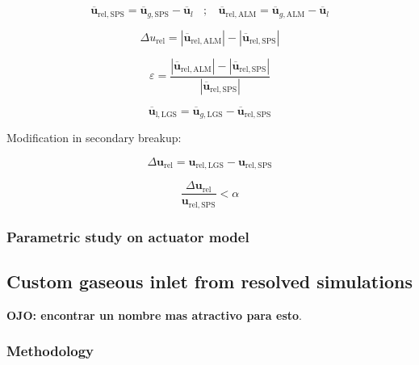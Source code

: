 \begin{equation}
\overline{\textbf{u}}_\mathrm{rel,SPS} = \overline{\textbf{u}}_{g,\mathrm{SPS}} - \overline{\textbf{u}}_l ~~~~ ; ~~~~  \overline{\textbf{u}}_\mathrm{rel,ALM} = \overline{\textbf{u}}_{g,\mathrm{ALM}} - \overline{\textbf{u}}_l
\end{equation}

\begin{equation}
\Delta u_\mathrm{rel} = | \overline{\textbf{u}}_\mathrm{rel,ALM}| - |\overline{\textbf{u}}_\mathrm{rel,SPS}|
\end{equation}

\begin{equation}
\varepsilon =  \frac{|\overline{\textbf{u}}_\mathrm{rel,ALM}| - |\overline{\textbf{u}}_\mathrm{rel,SPS}|}{|\overline{\textbf{u}}_\mathrm{rel,SPS}|} 
\end{equation}

\begin{equation}
\overline{\textbf{u}}_\mathrm{l,LGS} = \overline{\textbf{u}}_{g,\mathrm{LGS}} - \overline{\textbf{u}}_\mathrm{rel,SPS}
\end{equation}

Modification in secondary breakup:

\begin{equation}
\Delta \textbf{u}_\mathrm{rel} = \textbf{u}_\mathrm{rel,LGS} - \textbf{u}_\mathrm{rel,SPS}
\end{equation}

\begin{equation}
\frac{\Delta \textbf{u}_\mathrm{rel}}{\textbf{u}_\mathrm{rel,SPS}} < \alpha 
\end{equation}

\subsubsection{Parametric study on actuator model}


\subsection{Custom gaseous inlet from resolved simulations}

\textbf{OJO: encontrar un nombre mas atractivo para esto}.



\subsubsection{Methodology}


